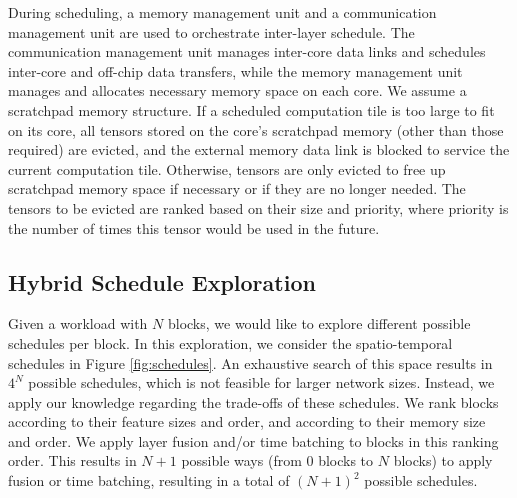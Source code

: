 During scheduling, a memory management unit and a communication management unit are used to orchestrate inter-layer schedule. The communication management unit manages inter-core data links and schedules inter-core and off-chip data transfers, while the memory management unit manages and allocates necessary memory space on each core. We assume a scratchpad memory structure. If a scheduled computation tile is too large to fit on its core, all tensors stored on the core's scratchpad memory (other than those required) are evicted, and the external memory data link is blocked to service the current computation tile. Otherwise, tensors are only evicted to free up scratchpad memory space if necessary or if they are no longer needed. The tensors to be evicted are ranked based on their size and priority, where priority is the number of times this tensor would be used in the future.




\subsection{Hybrid Schedule Exploration}
\label{sec:hb}

Given a workload with $N$ blocks, we would like to explore different possible schedules per block. In this exploration, we consider the spatio-temporal schedules in Figure \ref{fig:schedules}. An exhaustive search of this space results in $4^N$ possible schedules, which is not feasible for larger network sizes. Instead, we apply our knowledge regarding the trade-offs of these schedules. We rank blocks according to their feature sizes and order, and according to their memory size and order. We apply layer fusion and/or time batching to blocks in this ranking order. This results in $N+1$ possible ways (from $0$ blocks to $N$ blocks) to apply fusion or time batching, resulting in a total of $(N+1)^2$ possible schedules.

